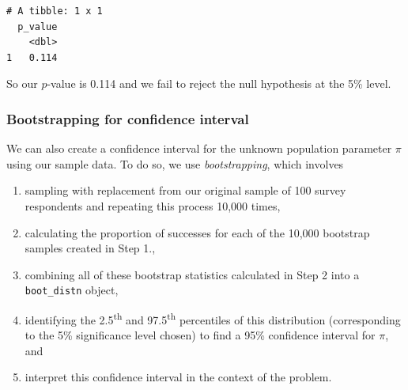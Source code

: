 \documentclass[12pt, krantz2,]{krantz}
\makeatletter
\newenvironment{Shaded}{\begin{snugshade}}{\end{snugshade}}
\newcommand{\DataTypeTok}[1]{\textcolor[rgb]{0.27,0.27,0.27}{#1}}
\newcommand{\DecValTok}[1]{\textcolor[rgb]{0.06,0.06,0.06}{#1}}
\newcommand{\KeywordTok}[1]{\textcolor[rgb]{0.27,0.27,0.27}{\textbf{#1}}}
\newcommand{\NormalTok}[1]{#1}
\newcommand{\OperatorTok}[1]{\textcolor[rgb]{0.43,0.43,0.43}{\textbf{#1}}}
\newcommand{\StringTok}[1]{\textcolor[rgb]{0.5,0.5,0.5}{#1}}
\providecommand{\tightlist}{%
  \setlength{\itemsep}{0pt}\setlength{\parskip}{0pt}}
\newenvironment{kframe}{%
\medskip{}
\setlength{\fboxsep}{.8em}
 \def\at@end@of@kframe{}%
 \ifinner\ifhmode%
  \def\at@end@of@kframe{\end{minipage}}%
  \begin{minipage}{\columnwidth}%
 \fi\fi%
 \def\FrameCommand##1{\hskip\@totalleftmargin \hskip-\fboxsep
 \colorbox{shadecolor}{##1}\hskip-\fboxsep
     \hskip-\linewidth \hskip-\@totalleftmargin \hskip\columnwidth}%
 \MakeFramed {\advance\hsize-\width
   \@totalleftmargin\z@ \linewidth\hsize
   \@setminipage}}%
 {\par\unskip\endMakeFramed%
 \at@end@of@kframe}
\renewenvironment{Shaded}{\begin{kframe}}{\end{kframe}}
\makeatother
\begin{document}
\begin{Shaded}
\end{Shaded}

\begin{verbatim}
# A tibble: 1 x 1
  p_value
    <dbl>
1   0.114
\end{verbatim}

So our \(p\)-value is 0.114 and we fail to reject the null hypothesis at the 5\% level.

\hypertarget{bootstrapping-for-confidence-interval-1}{%
\subsubsection*{Bootstrapping for confidence interval}\label{bootstrapping-for-confidence-interval-1}}


We can also create a confidence interval for the unknown population parameter \(\pi\) using our sample data. To do so, we use \emph{bootstrapping}, which involves

\begin{enumerate}
\def\labelenumi{\arabic{enumi}.}
\tightlist
\item
  sampling with replacement from our original sample of 100 survey respondents and repeating this process 10,000 times,
\item
  calculating the proportion of successes for each of the 10,000 bootstrap samples created in Step 1.,
\item
  combining all of these bootstrap statistics calculated in Step 2 into a \texttt{boot\_distn} object,
\item
  identifying the 2.5\textsuperscript{th} and 97.5\textsuperscript{th} percentiles of this distribution (corresponding to the 5\% significance level chosen) to find a 95\% confidence interval for \(\pi\), and
\item
  interpret this confidence interval in the context of the problem.
\end{enumerate}

\begin{Shaded}
\end{Shaded}
\end{document}
